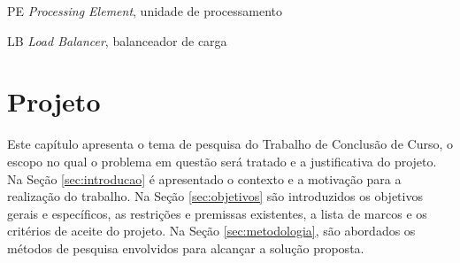 \documentclass[
	12pt,				%
	openright,			%
	twoside,			%
	a4paper,			%
	english,			%
	brazil,				%
	]{abntex2}
\begin{document}

 



\begin{siglas}
  \item[PE] \textit{Processing Element}, unidade de processamento
  \item[LB] \textit{Load Balancer}, balanceador de carga
\end{siglas}


\tableofcontents*
\cleardoublepage



\textual


\chapter{Projeto}

Este capítulo apresenta o tema de pesquisa do Trabalho de Conclusão de Curso, o escopo no qual o problema em questão será tratado e a justificativa do projeto. Na Seção \ref{sec:introducao} é apresentado o contexto e a motivação para a realização do trabalho. Na Seção \ref{sec:objetivos} são introduzidos os objetivos gerais e específicos, as restrições e premissas existentes, a lista de marcos e os critérios de aceite do projeto. Na Seção \ref{sec:metodologia}, são abordados os métodos de pesquisa envolvidos para alcançar a solução proposta.
\end{document}
